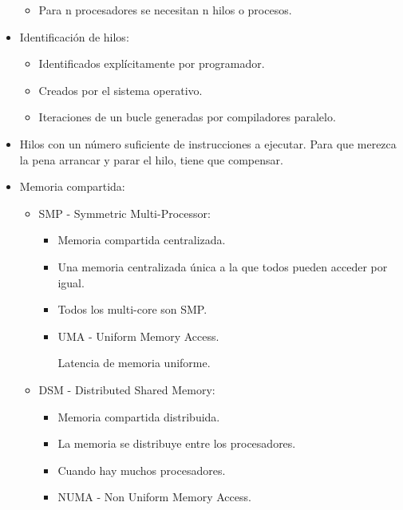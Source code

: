 \documentclass[12pt, twoside, openright]{report} %
\begin{document}
\begin{itemize}
      \begin{itemize}
      
      \item
        Para n procesadores se necesitan n hilos o procesos.
      \end{itemize}
    \item
      Identificación de hilos:

      \begin{itemize}
      
      \item
        Identificados explícitamente por programador.
      \item
        Creados por el sistema operativo.
      \item
        Iteraciones de un bucle generadas por compiladores paralelo.
      \end{itemize}
    \item
      Hilos con un número suficiente de instrucciones a ejecutar. Para
      que merezca la pena arrancar y parar el hilo, tiene que
      compensar.
    \item
      Memoria compartida:

      \begin{itemize}
      
      \item  SMP - Symmetric Multi-Processor:

        \begin{itemize}
          \item Memoria compartida centralizada.

          \item Una memoria centralizada única a la que todos pueden acceder
          por igual.
        
          \item Todos los multi-core son SMP.

          \item UMA - Uniform Memory Access.
          
          Latencia de memoria uniforme.
          \begin{figure}[H]
            {\def\svgwidth{.6\textwidth}
  }
          \end{figure}
        \end{itemize}

        \item DSM - Distributed Shared Memory:
      \begin{itemize}
        \item Memoria compartida distribuida.
        \item La memoria se distribuye entre los procesadores.
        \item Cuando hay muchos procesadores.
        \item NUMA - Non Uniform Memory Access.
            

\end{itemize}
\end{itemize}
\end{itemize}
\end{document}
